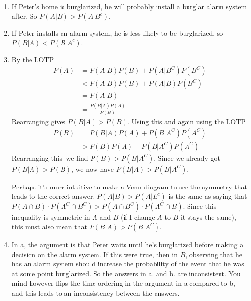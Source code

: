 

\setcounter{theorem}{13}
\begin{exercise}[BH.2.14]
\begin{solution}~
	\begin{enumerate}
		\item If Peter's home is burglarized, he will probably install a burglar alarm system after. So $P(A|B)>P(A|B^{c})$.
		\item If Peter installs an alarm system, he is less likely to be burglarized, so $P(B|A)<P(B|A^{c})$. 
		\item By the LOTP
		\begin{align*}
			P(A)&= P(A|B)P(B)+P(A|B^{C})P(B^{C})\\
			&<P(A|B)P(B) + P(A|B)P(B^{C})\\
			&=P(A|B) \\&= \frac{P(B|A)P(A)}{P(B)}
		\end{align*}
		Rearranging gives $P(B|A)>P(B)$. 
		Using this and again using the LOTP
		\begin{align*}
			P(B) &= P(B|A)P(A) + P(B|A^{C})P(A^{C}) \\
			&>P(B)P(A)+P(B|A^{C})P(A^{C})
		\end{align*}
		Rearranging this, we find $P(B)>P(B|A^{C})$. Since we already got $P(B|A)>P(B)$, we now have $P(B|A)>P(B|A^{C})$.

		Perhaps it's more intuitive to make a Venn diagram to see the symmetry that leads to the correct answer. $P(A|B)>P(A|B^c)$ is the same as saying that $P(A\cap B)\cdot P(A^{C}\cap  B^{C})>P(A\cap B^C)\cdot P(A^{C}\cap B)$.  Since this inequality is symmetric in $A$ and $B$ (if I change $A$ to $B$ it stays the same), this must also mean that $P(B|A)>P(B|A^{C})$.
		\item In a, the argument is that Peter waits until he's burglarized before making a decision on the alarm system. If this were true, then in $B$, observing that he has an alarm system should increase the probability of the event that he was at some point burglarized. So the answers in a. and b. are inconsistent. You mind however flips the time ordering in the argument in a compared to b, and this leads to an inconsistency between the answers.
	\end{enumerate}
\end{solution}
\end{exercise}

